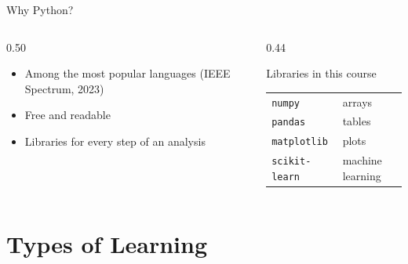 \documentclass[handout,aspectratio=169,t,9pt]{beamer}
\begin{document}
\begin{frame}{Why Python?}
  \begin{columns}[T,onlytextwidth]
    \begin{column}{0.50\textwidth}
      \begin{itemize}
        \item Among the most popular languages (IEEE Spectrum, 2023)
        \item Free and readable
        \item Libraries for every step of an analysis
      \end{itemize}
    \end{column}
    \begin{column}{0.44\textwidth}
      \begin{sibbox}{Libraries in this course}
        \begin{tabular}{@{}ll@{}}
          \texttt{numpy}        & arrays \\
          \texttt{pandas}       & tables \\
          \texttt{matplotlib}   & plots \\
          \texttt{scikit-learn} & machine learning \\
        \end{tabular}
      \end{sibbox}
    \end{column}
  \end{columns}

\end{frame}

\section{Types of Learning}
\end{document}
